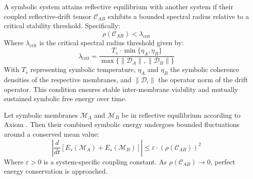 \begin{axiom}
\label{axiom:bk5_reflective_equilibrium_stability_flux}
A symbolic system attains reflective equilibrium with another system if their coupled reflective-drift tensor $\mathcal{C}_{AB}$ exhibits a bounded spectral radius relative to a critical stability threshold. Specifically:
\begin{equation}
\rho(\mathcal{C}_{AB}) < \lambda_{\text{crit}}
\end{equation}
Where $\lambda_{\text{crit}}$ is the critical spectral radius threshold given by:
\begin{equation}
\lambda_{\text{crit}} = \frac{T_s \cdot \min\{\eta_A, \eta_B\}}{\max\{\|\mathscr{D}_A\|, \|\mathscr{D}_B\|\}} 
\end{equation}
With $T_s$ representing symbolic temperature, $\eta_A$ and $\eta_B$ the symbolic coherence densities of the respective membranes, and $\|\mathscr{D}_i\|$ the operator norm of the drift operator.
This condition ensures stable inter-membrane viability and mutually sustained symbolic free energy over time.
\end{axiom}
\begin{theorem} \label{theorem:bk5_reflective_equilibrium_conservation}
Let symbolic membranes $\mathscr{M}_A$ and $\mathscr{M}_B$ be in reflective equilibrium according to Axiom . Then their combined symbolic energy undergoes bounded fluctuations around a conserved mean value:
\begin{equation}
\left| \frac{d}{dt}[E_s(\mathscr{M}_A) + E_s(\mathscr{M}_B)] \right| \leq \varepsilon \cdot (\rho(\mathcal{C}_{AB}))^2
\end{equation}
Where $\varepsilon > 0$ is a system-specific coupling constant. As $\rho(\mathcal{C}_{AB}) \to 0$, perfect energy conservation is approached.
\end{theorem}
